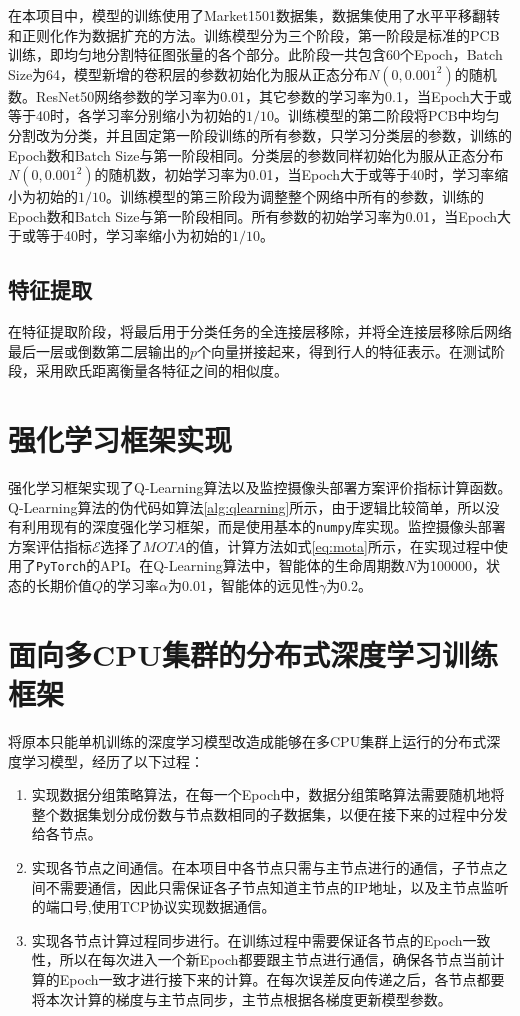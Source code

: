 在本项目中，模型的训练使用了Market1501\cite{zheng2015scalable}数据集，数据集使用了水平平移翻转和正则化作为数据扩充的方法。训练模型分为三个阶段，第一阶段是标准的PCB训练，即均匀地分割特征图张量的各个部分。此阶段一共包含60个Epoch，Batch Size为64，模型新增的卷积层的参数初始化为服从正态分布$N(0, 0.001^2)$的随机数。ResNet50网络参数的学习率为0.01，其它参数的学习率为0.1，当Epoch大于或等于40时，各学习率分别缩小为初始的$1/10$。训练模型的第二阶段将PCB中均匀分割改为分类，并且固定第一阶段训练的所有参数，只学习分类层的参数，训练的Epoch数和Batch Size与第一阶段相同。分类层的参数同样初始化为服从正态分布$N(0, 0.001^2)$的随机数，初始学习率为0.01，当Epoch大于或等于40时，学习率缩小为初始的$1/10$。训练模型的第三阶段为调整整个网络中所有的参数，训练的Epoch数和Batch Size与第一阶段相同。所有参数的初始学习率为0.01，当Epoch大于或等于40时，学习率缩小为初始的$1/10$。

\subsection{特征提取}

在特征提取阶段，将最后用于分类任务的全连接层移除，并将全连接层移除后网络最后一层或倒数第二层输出的$p$个向量拼接起来，得到行人的特征表示。在测试阶段，采用欧氏距离衡量各特征之间的相似度。

\section{强化学习框架实现}

强化学习框架实现了Q-Learning算法以及监控摄像头部署方案评价指标计算函数。Q-Learning算法的伪代码如算法\ref{alg:qlearning}所示，由于逻辑比较简单，所以没有利用现有的深度强化学习框架，而是使用基本的\texttt{numpy}库实现。监控摄像头部署方案评估指标$\mathcal{E}$选择了$\mathit{MOTA}$的值，计算方法如式\ref{eq:mota}所示，在实现过程中使用了\texttt{PyTorch}的API。在Q-Learning算法中，智能体的生命周期数$N$为100000，状态的长期价值$Q$的学习率$\alpha$为0.01，智能体的远见性$\gamma$为0.2。

\section{面向多CPU集群的分布式深度学习训练框架}

将原本只能单机训练的深度学习模型改造成能够在多CPU集群上运行的分布式深度学习模型，经历了以下过程：

\begin{enumerate}
    \item 实现数据分组策略算法，在每一个Epoch中，数据分组策略算法需要随机地将整个数据集划分成份数与节点数相同的子数据集，以便在接下来的过程中分发给各节点。
    \item 实现各节点之间通信。在本项目中各节点只需与主节点进行的通信，子节点之间不需要通信，因此只需保证各子节点知道主节点的IP地址，以及主节点监听的端口号,使用TCP协议实现数据通信。
    \item 实现各节点计算过程同步进行。在训练过程中需要保证各节点的Epoch一致性，所以在每次进入一个新Epoch都要跟主节点进行通信，确保各节点当前计算的Epoch一致才进行接下来的计算。在每次误差反向传递之后，各节点都要将本次计算的梯度与主节点同步，主节点根据各梯度更新模型参数。
\end{enumerate}